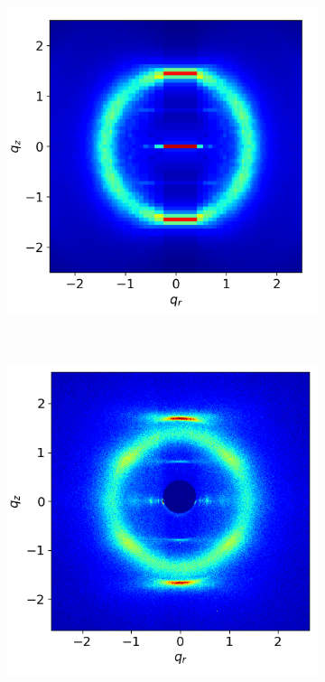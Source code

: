 \documentclass{article}
\begin{document}
  \begin{figure}
  \begin{subfigure}{0.3\linewidth}
        \centering
        \vspace{-0.2em}
        \includegraphics[width=1.018\linewidth]{offset_rzplot.png}
        \caption{}~\label{fig:rz_offset}
  \end{subfigure}
  \begin{subfigure}{0.3\linewidth}
        \centering
        \includegraphics[scale=0.29]{WAXS_raw.png}

\end{subfigure}
\end{figure}
\end{document}
